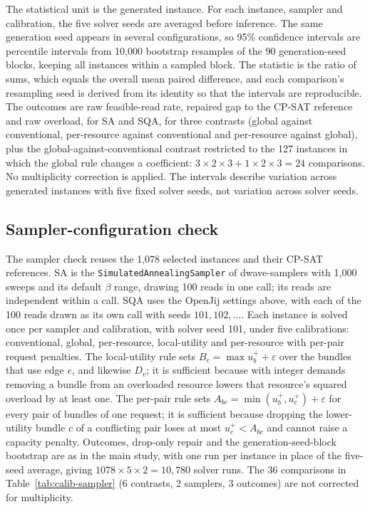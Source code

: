 \documentclass[pdflatex,sn-nature]{sn-jnl}
\newcommand{\eps}{\varepsilon}
\theoremstyle{plain}
\theoremstyle{remark}
\begin{document}
The statistical unit is the generated instance. For each instance, sampler and calibration, the five solver seeds are averaged before inference. The same generation seed appears in several configurations, so 95\% confidence intervals are percentile intervals from 10,000 bootstrap resamples of the 90 generation-seed blocks, keeping all instances within a sampled block. The statistic is the ratio of sums, which equals the overall mean paired difference, and each comparison's resampling seed is derived from its identity so that the intervals are reproducible. The outcomes are raw feasible-read rate, repaired gap to the CP-SAT reference and raw overload, for SA and SQA, for three contrasts (global against conventional, per-resource against conventional and per-resource against global), plus the global-against-conventional contrast restricted to the 127 instances in which the global rule changes a coefficient: $3\times2\times3+1\times2\times3=24$ comparisons. No multiplicity correction is applied. The intervals describe variation across generated instances with five fixed solver seeds, not variation across solver seeds.

\subsection{Sampler-configuration check}

The sampler check reuses the 1,078 selected instances and their CP-SAT references. SA is the \texttt{SimulatedAnnealingSampler} of dwave-samplers with 1,000 sweeps and its default $\beta$ range, drawing 100 reads in one call; its reads are independent within a call. SQA uses the OpenJij settings above, with each of the 100 reads drawn as its own call with seeds $101,102,\ldots$. Each instance is solved once per sampler and calibration, with solver seed 101, under five calibrations: conventional, global, per-resource, local-utility and per-resource with per-pair request penalties. The local-utility rule sets $B_e=\max u_b^+ +\eps$ over the bundles that use edge $e$, and likewise $D_v$; it is sufficient because with integer demands removing a bundle from an overloaded resource lowers that resource's squared overload by at least one. The per-pair rule sets $A_{bc}=\min(u_b^+,u_c^+)+\eps$ for every pair of bundles of one request; it is sufficient because dropping the lower-utility bundle $c$ of a conflicting pair loses at most $u_c^+<A_{bc}$ and cannot raise a capacity penalty. Outcomes, drop-only repair and the generation-seed-block bootstrap are as in the main study, with one run per instance in place of the five-seed average, giving $1078\times5\times2=10{,}780$ solver runs. The 36 comparisons in Table~\ref{tab:calib-sampler} (6 contrasts, 2 samplers, 3 outcomes) are not corrected for multiplicity.
\end{document}
